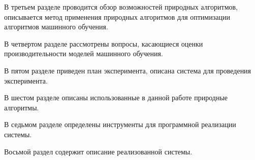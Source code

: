 В третьем разделе проводится обзор возможностей природных алгоритмов, описывается
метод применения природных алгоритмов для оптимизации алгоритмов машинного обучения.

В четвертом разделе рассмотрены вопросы, касающиеся оценки производительности
моделей машинного обучения.

В пятом разделе приведен план эксперимента, описана система для проведения эксперимента.

В шестом разделе описаны использованные в данной работе природные алгоритмы.

В седьмом разделе определены инструменты для программной реализации системы.

Восьмой раздел содержит описание реализованной системы.

